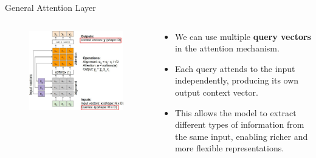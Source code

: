 \begin{frame}[allowframebreaks]{General Attention Layer}
    \framebreak

    \begin{columns}
    \begin{column}{0.6\textwidth}
        \begin{figure}
            \flushleft
            \includegraphics[width=\linewidth,height=\textheight,keepaspectratio]{images/transformers/slide_37_1_img.jpg}
        \end{figure}
    \end{column}
    \begin{column}{0.4\textwidth}
        \begin{itemize}
            \item We can use multiple \textbf{query vectors} in the attention mechanism.
            \item Each query attends to the input independently, producing its own output context vector.
            \item This allows the model to extract different types of information from the same input, enabling richer and more flexible representations.
        \end{itemize}
    \end{column}
    \end{columns}

    \framebreak


\end{frame}
